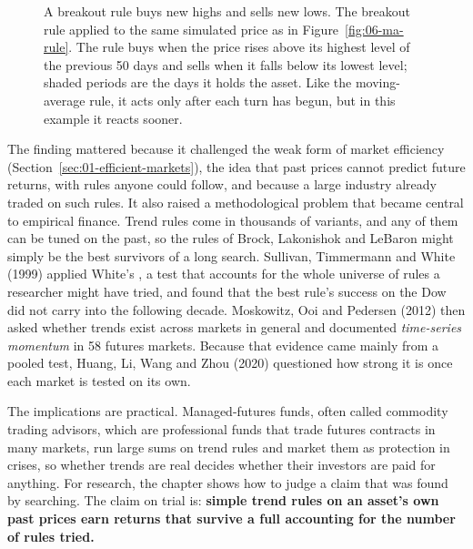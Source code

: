 \begin{figure}[htbp]
{%
}
\caption{A breakout rule buys new highs and sells new lows. The breakout rule applied to the same simulated price as in Figure~\ref{fig:06-ma-rule}. The rule buys when the price rises above its highest level of the previous 50 days and sells when it falls below its lowest level; shaded periods are the days it holds the asset. Like the moving-average rule, it acts only after each turn has begun, but in this example it reacts sooner.}
\label{fig:06-breakout-rule}
\end{figure}


The finding mattered because it challenged the weak form of market efficiency (Section~\ref{sec:01-efficient-markets}), the idea that past prices cannot predict future returns, with rules anyone could follow, and because a large industry already traded on such rules. It also raised a methodological problem that became central to empirical finance. Trend rules come in thousands of variants, and any of them can be tuned on the past, so the rules of Brock, Lakonishok and LeBaron might simply be the best survivors of a long search. Sullivan, Timmermann and White (1999) applied White's , a test that accounts for the whole universe of rules a researcher might have tried, and found that the best rule's success on the Dow did not carry into the following decade. Moskowitz, Ooi and Pedersen (2012) then asked whether trends exist across markets in general and documented \emph{time-series momentum} in 58 futures markets. Because that evidence came mainly from a pooled test, Huang, Li, Wang and Zhou (2020) questioned how strong it is once each market is tested on its own.

The implications are practical. Managed-futures funds, often called commodity trading advisors, which are professional funds that trade futures contracts in many markets, run large sums on trend rules and market them as protection in crises, so whether trends are real decides whether their investors are paid for anything. For research, the chapter shows how to judge a claim that was found by searching. The claim on trial is: \textbf{simple trend rules on an asset's own past prices earn returns that survive a full accounting for the number of rules tried.}

